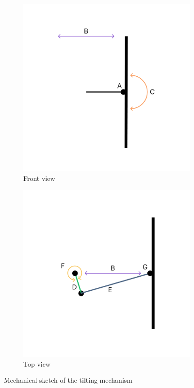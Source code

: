 \begin{figure}[ht]
  \begin{subfigure}[b]{0.49\textwidth}
    \includegraphics[width=\textwidth]{src/assets/pictures/construction/mec_front.png}
    \caption{Front view}
    \label{fig:const:tilt:mech_front}
  \end{subfigure}
  \hfill
  \begin{subfigure}[b]{0.49\textwidth}
    \includegraphics[width=\textwidth]{src/assets/pictures/construction/mec_top.png}
    \caption{Top view}
    \label{fig:const:tilt:mech_top}
  \end{subfigure}
  \caption{Mechanical sketch of the tilting mechanism}
  \label{fig:const:tilt:mech}
\end{figure}
